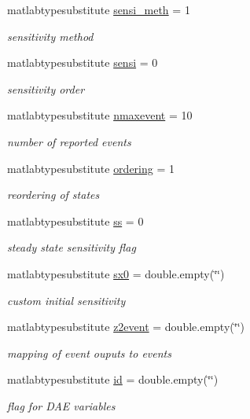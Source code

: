 \begin{DoxyCompactItemize}
matlabtypesubstitute \hyperlink{classamioption_ab31e219eb42bc06629c3f247a01b9906}{sensi\+\_\+meth} = 1
\begin{DoxyCompactList}\small\item\em sensitivity method \end{DoxyCompactList}\item 
matlabtypesubstitute \hyperlink{classamioption_a7dd31d33463c5a709251bcef0eccaa36}{sensi} = 0
\begin{DoxyCompactList}\small\item\em sensitivity order \end{DoxyCompactList}\item 
matlabtypesubstitute \hyperlink{classamioption_a85519d27e7231ac625e5b2deee92165a}{nmaxevent} = 10
\begin{DoxyCompactList}\small\item\em number of reported events \end{DoxyCompactList}\item 
matlabtypesubstitute \hyperlink{classamioption_aa5d555210685086c19e5d08afca6685b}{ordering} = 1
\begin{DoxyCompactList}\small\item\em reordering of states \end{DoxyCompactList}\item 
matlabtypesubstitute \hyperlink{classamioption_a8f60c8102d29fcd525162d02eed4566b}{ss} = 0
\begin{DoxyCompactList}\small\item\em steady state sensitivity flag \end{DoxyCompactList}\item 
matlabtypesubstitute \hyperlink{classamioption_ae40f9a7172d3a41725c151afaec347f7}{sx0} = double.\+empty(\char`\"{}\char`\"{})
\begin{DoxyCompactList}\small\item\em custom initial sensitivity \end{DoxyCompactList}\item 
matlabtypesubstitute \hyperlink{classamioption_a7a7be015feeb7a346dceccd49e622b4b}{z2event} = double.\+empty(\char`\"{}\char`\"{})
\begin{DoxyCompactList}\small\item\em mapping of event ouputs to events \end{DoxyCompactList}\item 
matlabtypesubstitute \hyperlink{classamioption_acf2488b95c97e0378c9bf49de3b50f28}{id} = double.\+empty(\char`\"{}\char`\"{})
\begin{DoxyCompactList}\small\item\em flag for D\+A\+E variables \end{DoxyCompactList}\end{DoxyCompactItemize}



